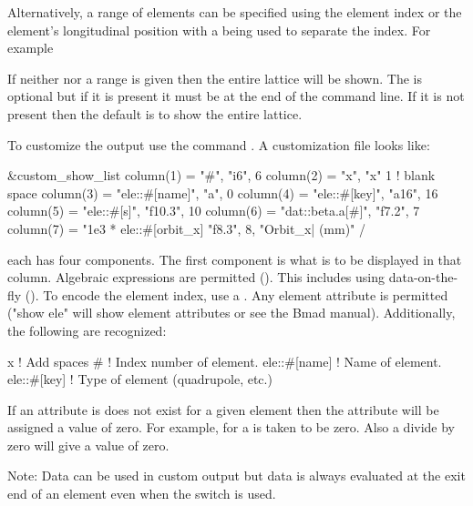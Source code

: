 {{{\begin{description}
Alternatively, a range of elements can be specified using the element
index or the element's longitudinal position with a  being
used to separate the index. For example
If neither  nor a range is given then the entire lattice
will be shown. The  is optional but if it is present
it must be at the end of the command line.  If it is not present then
the default is to show the entire lattice.

To customize the output use the command . A customization file looks like:
\begin{example}
  &custom_show_list
    column(1) = "#",                     "i6",     6 
    column(2) = "x",                     "x"       1       ! blank space
    column(3) = "ele::#[name]",          "a",      0
    column(4) = "ele::#[key]",           "a16",   16
    column(5) = "ele::#[s]",             "f10.3", 10
    column(6) = "dat::beta.a[#]",        "f7.2",   7
    column(7) = "1e3 * ele::#[orbit_x]   "f8.3",   8, "Orbit_x| (mm)" 
  /
\end{example}
each  has four components. The first component is what
is to be displayed in that column. Algebraic expressions are permitted
(). This includes using data-on-the-fly
(). To encode the element index, use a \vn{#}.
Any element attribute is permitted ("show ele" will show element
attributes or see the Bmad manual). Additionally, the following are
recognized:
\begin{example}
  x                           ! Add spaces
  #                           ! Index number of element.
  ele::#[name]                ! Name of element.
  ele::#[key]                 ! Type of element (quadrupole, etc.)
\end{example}
If an attribute is does not exist for a given element then the
attribute will be assigned a value of zero. For example, 
for a  is taken to be zero. Also a divide by zero will
give a value of zero.

Note: Data can be used in custom output but data is always evaluated at
the exit end of an element even when the  switch is used.


\end{description}}}}
